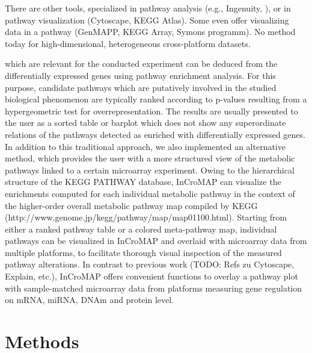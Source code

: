 \documentclass{bioinfo}
\begin{document}


There are other tools, specialized in pathway analysis (e.g., Ingenuity, ), or in pathway
visualization (Cytoscape, KEGG Atlas). Some even offer visualizing data in a pathway (GenMAPP, KEGG
Array, Symons programm). No method today for high-dimensional, heterogeneous cross-platform
datasets.

which are relevant for the conducted experiment can be deduced from the differentially expressed
genes using pathway enrichment analysis. For this purpose, candidate pathways which are putatively
involved in the studied biological phenomenon are typically ranked according to p-values resulting
from a hypergeometric test for overrepresentation. The results are usually presented to the user as
a sorted table or barplot which does not show any superordinate relations of the pathways detected
as enriched with differentially expressed genes. In addition to this traditional approach, we also
implemented an alternative method, which provides the user with a more structured view of the
metabolic pathways linked to a certain microarray experiment. Owing to the hierarchical structure of
the KEGG PATHWAY database, InCroMAP can visualize the enrichments computed for each individual
metabolic pathway in the context of the higher-order overall metabolic pathway map compiled by KEGG
(http://www.genome.jp/kegg/pathway/map/map01100.html). Starting from either a ranked pathway table
or a colored meta-pathway map, individual pathways can be visualized in InCroMAP and overlaid with
microarray data from multiple platforms, to facilitate thorough visual inspection of the measured
pathway alterations. In contrast to previous work (TODO: Refs zu Cytoscape, Explain, etc.), InCroMAP
offers convenient functions to overlay a pathway plot with sample-matched microarray data from
platforms measuring gene regulation on mRNA, miRNA, DNAm and protein level.


\section{Methods} 
\end{document}
